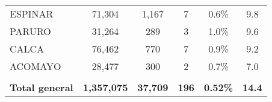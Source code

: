 \begin{tabular}{lccccc}
	\cellcolor[HTML]{FFFF99}ESPINAR                                 & 71,304               & 1,167                                & 7                    & 0.6\%                      & 9.8                                         \\
	\cellcolor[HTML]{FFFF99}PARURO                                  & 31,264               & 289                                  & 3                    & 1.0\%                      & 9.6                                         \\
	\cellcolor[HTML]{FFFF99}CALCA                                   & 76,462               & 770                                  & 7                    & 0.9\%                      & 9.2                                         \\
	\cellcolor[HTML]{FFFF99}ACOMAYO                                 & 28,477               & 300                                  & 2                    & 0.7\%                      & 7.0                                         \\
	& \multicolumn{1}{l}{} & \multicolumn{1}{l}{}                 & \multicolumn{1}{l}{} & \multicolumn{1}{l}{}       & \multicolumn{1}{l}{}                        \\
	\rowcolor[HTML]{DDEBF7} 
	\textbf{Total general}                                          & \textbf{1,357,075}   & \textbf{37,709}                      & \textbf{196}         & \textbf{0.52\%}            & \textbf{14.4}                              
\end{tabular}